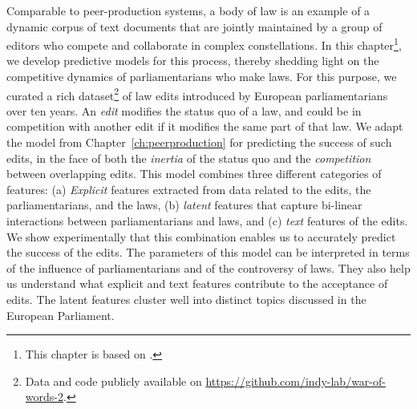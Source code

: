 
Comparable to peer-production systems, a body of law is an example of a dynamic corpus of text documents that are jointly maintained by a group of editors who compete and collaborate in complex constellations.
In this chapter\footnote{This chapter is based on \citet{kristof2020war, kristof2021war}.}, we develop predictive models for this process, thereby shedding light on the competitive dynamics of parliamentarians who make laws.
For this purpose, we curated a rich dataset\footnote{Data and code publicly available on \href{https://github.com/indy-lab/war-of-words-2}{https://github.com/indy-lab/war-of-words-2}.} of  law edits introduced by European parliamentarians over ten years.
An \textit{edit} modifies the status quo of a law, and could be in competition with another edit if it modifies the same part of that law.
We adapt the \interank{} model from Chapter~\ref{ch:peerproduction} for predicting the success of such edits, in the face of both the \textit{inertia} of the status quo and the \textit{competition} between overlapping edits.
This model combines three different categories of features:
(a) \emph{Explicit} features extracted from data related to the edits, the parliamentarians, and the laws, (b) \emph{latent} features that capture bi-linear interactions between parliamentarians and laws, and (c) \emph{text} features of the edits.
We show experimentally that this combination enables us to accurately predict the success of the edits.
The parameters of this model can be interpreted in terms of the influence of parliamentarians and of the controversy of laws.
They also help us understand what explicit and text features contribute to the acceptance of edits.
The latent features cluster well into distinct topics discussed in the European Parliament.
